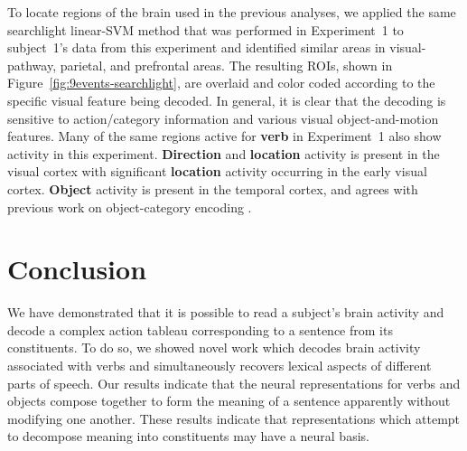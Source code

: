 To locate regions of the brain used in the previous analyses, we applied the
same searchlight linear-SVM method that was performed in Experiment~1 to
subject~1's data from this experiment and identified similar areas in
visual-pathway, parietal, and prefrontal areas.
%
The resulting ROIs, shown in Figure~\ref{fig:9events-searchlight}, are overlaid
and color coded according to the specific visual feature being decoded.
%
In general, it is clear that the decoding is sensitive to action/category
information and various visual object-and-motion features.
%
Many of the same regions active for \textbf{verb} in Experiment~1 also
show activity in this experiment.
%
\textbf{Direction} and \textbf{location} activity is present in the visual
cortex with significant \textbf{location} activity occurring in the early
visual cortex.
%
\textbf{Object} activity is present in the temporal cortex, and agrees with
previous work on object-category encoding \citep{Gazzaniga2008}.

\section{Conclusion}
\label{sec:conclusion-fmri}

%
We have demonstrated that it is possible to read a subject's brain activity and
decode a complex action tableau corresponding to a sentence from its
constituents.
%
To do so, we showed novel work which decodes brain activity associated with
verbs and simultaneously recovers lexical aspects of different parts of speech.
%
Our results indicate that the neural representations for verbs and objects
compose together to form the meaning of a sentence apparently without modifying
one another.
%
These results indicate that representations which attempt to decompose meaning
into constituents may have a neural basis.

